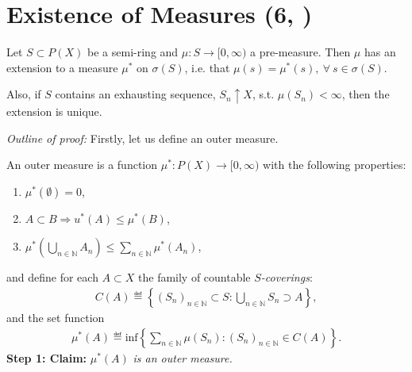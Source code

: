\section{Existence of Measures \tiny{ (6, \cite{schilling2017measures})}}
\begin{theorem}[Carathéodory]
    Let \(S\subset P(X)\) be a semi-ring and \(\mu:S\rightarrow[0,\infty)\) a pre-measure. Then \(\mu\) has an extension to a measure \(\mu^{*}\)
    on \(\sigma(S)\), i.e. that \(\mu(s) = \mu^{*}(s), \ \forall \ s\in \sigma(S)\). 
    
    Also, if \(S\) contains an exhausting sequence, \(S_n\uparrow X\), s.t. \(\mu(S_n) < \infty\), then the extension is 
    unique.
\end{theorem}
\emph{Outline of proof:} Firstly, let us define an outer measure. 
    \begin{definition}
        An outer measure is a function \(\mu^{*}: P(X) \rightarrow [0,\infty)\) with the following properties:
        \begin{enumerate}
            \item \(\mu^{*}(\emptyset) = 0\),
            \item \(A\subset B \Rightarrow u^{*}(A) \leq \mu^{*}(B)\),
            \item \(\mu^{*}\left( \bigcup\limits_{n\in\mathbb{N}} A_n \right)\leq \sum\limits_{n\in\mathbb{N}} \mu^{*}(A_n)\),
        \end{enumerate}
    \end{definition}
    and define for each \(A\subset X\) the family of countable \(S\)\emph{-coverings}:
    \begin{align*}
        C(A) \eqdef \left\{(S_n)_{n\in\mathbb{N}} \subset S : \bigcup\limits_{n\in\mathbb{N}} S_n\supset A\right\},
    \end{align*}
    and the set function
    \begin{align*}
        \mu^{*}(A) \eqdef \text{inf}\left\{ \sum\limits_{n\in\mathbb{N}} \mu(S_n): (S_n)_{n\in\mathbb{N}}\in C(A)\right\}.
    \end{align*}
    \textbf{Step 1: Claim: } \(\mu^{*}(A)\)\emph{ is an outer measure.}
